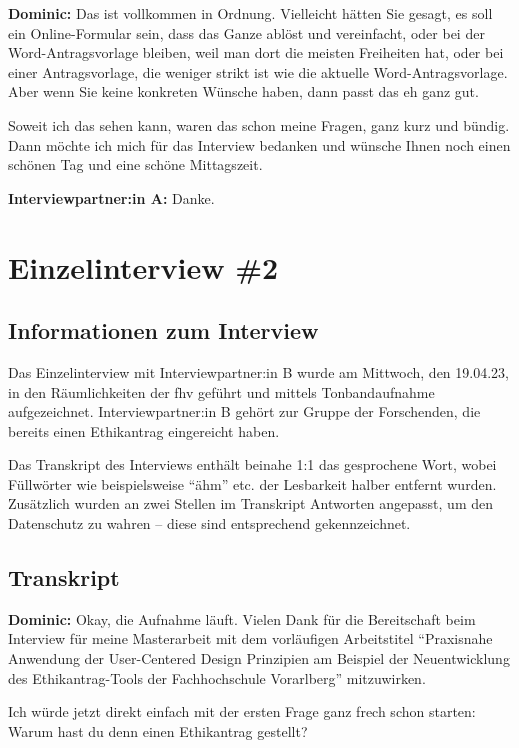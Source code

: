 \documentclass[a4paper,12pt,twoside,numbers=noendperiod]{scrreprt}
\begin{document}
\textbf{Dominic:} Das ist vollkommen in Ordnung. Vielleicht hätten Sie gesagt, es soll ein Online-Formular sein, dass das Ganze ablöst und vereinfacht, oder bei der Word-Antragsvorlage bleiben, weil man dort die meisten Freiheiten hat, oder bei einer Antragsvorlage, die weniger strikt ist wie die aktuelle Word-Antragsvorlage. Aber wenn Sie keine konkreten Wünsche haben, dann passt das eh ganz gut. 

Soweit ich das sehen kann, waren das schon meine Fragen, ganz kurz und bündig. Dann möchte ich mich für das Interview bedanken und wünsche Ihnen noch einen schönen Tag und eine schöne Mittagszeit.

\textbf{Interviewpartner:in A:} Danke.

\cleardoublepage
\chapter{Einzelinterview \#2}
\label{appendix:interview-2}

\section{Informationen zum Interview}
\label{appendix:interview-2-infos}

Das Einzelinterview mit Interviewpartner:in B wurde am Mittwoch, den 19.04.23, in den Räumlichkeiten der \ac{fhv} geführt und mittels Tonbandaufnahme aufgezeichnet. Interviewpartner:in B gehört zur Gruppe der Forschenden, die bereits einen Ethikantrag eingereicht haben.

Das Transkript des Interviews enthält beinahe 1:1 das gesprochene Wort, wobei Füllwörter wie beispielsweise \enquote{ähm} etc. der Lesbarkeit halber entfernt wurden. Zusätzlich wurden an zwei Stellen im Transkript Antworten angepasst, um den Datenschutz zu wahren -- diese sind entsprechend gekennzeichnet.

\section{Transkript}
\label{appendix:interview-2-transkript}

\textbf{Dominic:} Okay, die Aufnahme läuft. Vielen Dank für die Bereitschaft beim Interview für meine Masterarbeit mit dem vorläufigen Arbeitstitel \enquote{Praxisnahe Anwendung der User-Centered Design Prinzipien am Beispiel der Neuentwicklung des Ethikantrag-Tools der Fachhochschule Vorarlberg} mitzuwirken.

Ich würde jetzt direkt einfach mit der ersten Frage ganz frech schon starten: Warum hast du denn einen Ethikantrag gestellt?
\end{document}
